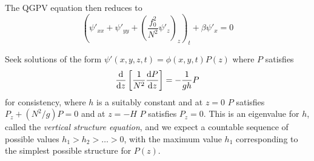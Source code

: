 \documentclass{jknotes}
\begin{document}
The QGPV equation then reduces to
\begin{equation}
	\left( \psi'_{xx} + \psi'_{yy} + (\frac{f_0^2}{N^2}
	\psi'_z)_z\right)_t + \beta \psi'_x = 0
\end{equation}

Seek solutions of the form $\psi'(x,y,z,t) = \phi(x,y,t) P(z)$ where $P$
satisfies
\begin{equation}
	\frac{\diffd}{\diffd z} \left[ \frac{1}{N^2} \frac{\diffd P}{\diffd
	z}\right] = -\frac{1}{gh} P
\end{equation}
for consistency, where $h$ is a suitably constant and at $z=0$ $P$ satisfies
$P_z + (N^2/g)P = 0$ and at $z=-H$ $P$ satisfies $P_z = 0$. This is an
eigenvalue for $h$, called the \emph{vertical structure equation}, and we
expect a countable sequence of possible values $h_1 > h_2 > \dots > 0$, with
the maximum value $h_1$ corresponding to the simplest possible structure for
$P(z)$.
\end{document}
